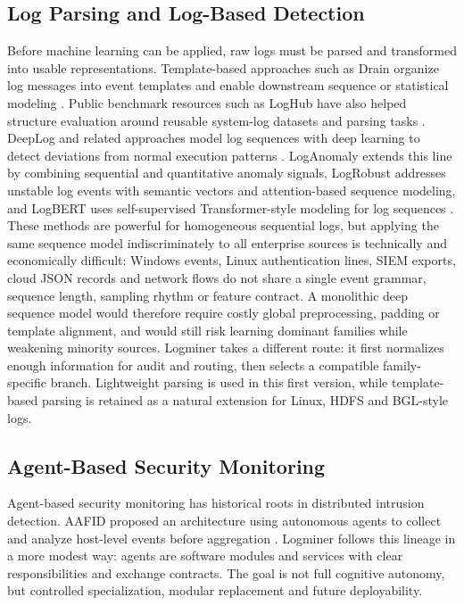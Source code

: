\documentclass[conference]{IEEEtran}
\newcommand{\logminer}{Logminer}
\begin{document}
\subsection{Log Parsing and Log-Based Detection}
Before machine learning can be applied, raw logs must be parsed and transformed into usable representations. Template-based approaches such as Drain organize log messages into event templates and enable downstream sequence or statistical modeling \cite{he2016drain}. Public benchmark resources such as LogHub have also helped structure evaluation around reusable system-log datasets and parsing tasks \cite{zhu2023loghub}. DeepLog and related approaches model log sequences with deep learning to detect deviations from normal execution patterns \cite{du2017deeplog}. LogAnomaly extends this line by combining sequential and quantitative anomaly signals, LogRobust addresses unstable log events with semantic vectors and attention-based sequence modeling, and LogBERT uses self-supervised Transformer-style modeling for log sequences \cite{meng2019loganomaly,zhang2019logrobust,guo2021logbert}. These methods are powerful for homogeneous sequential logs, but applying the same sequence model indiscriminately to all enterprise sources is technically and economically difficult: Windows events, Linux authentication lines, SIEM exports, cloud JSON records and network flows do not share a single event grammar, sequence length, sampling rhythm or feature contract. A monolithic deep sequence model would therefore require costly global preprocessing, padding or template alignment, and would still risk learning dominant families while weakening minority sources. \logminer{} takes a different route: it first normalizes enough information for audit and routing, then selects a compatible family-specific branch. Lightweight parsing is used in this first version, while template-based parsing is retained as a natural extension for Linux, HDFS and BGL-style logs.

\subsection{Agent-Based Security Monitoring}
Agent-based security monitoring has historical roots in distributed intrusion detection. AAFID proposed an architecture using autonomous agents to collect and analyze host-level events before aggregation \cite{balasubramaniyan1998aafid}. \logminer{} follows this lineage in a more modest way: agents are software modules and services with clear responsibilities and exchange contracts. The goal is not full cognitive autonomy, but controlled specialization, modular replacement and future deployability.
\end{document}
